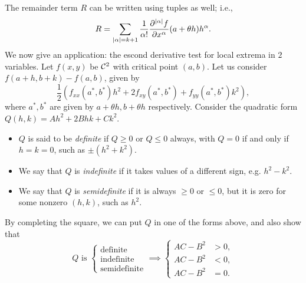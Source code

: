 The remainder term $R$ can be written using tuples as well; i.e.,
\[ R = \sum_{\left\lvert \alpha \right\rvert = k+1} \frac{1}{\alpha!} \frac{\partial^{\left\lvert \alpha \right\rvert} f}{\partial x^\alpha} (a + \theta h) h^\alpha. \]
We now give an application: the escond derivative test for local extrema in $2$ variables. Let $f(x, y)$ be $\mathcal C^2$ with critical point $(a, b)$. Let us consider $f(a + h, b + k) - f(a, b)$, given by
\[ \frac{1}{2} \left( f_{xx} (a^\ast, b^\ast) h^2 + 2 f_{xy} (a^\ast, b^\ast) + f_{yy} (a^\ast, b^\ast) k^2 \right), \]
where $a^\ast, b^\ast$ are given by $a + \theta h, b + \theta h$ respectively. Consider the quadratic form $Q(h, k) = Ah^2 + 2Bhk + Ck^2$.
\begin{itemize}
    \item $Q$ is said to be \textit{definite} if $Q \geq 0$ or $Q \leq 0$ always, with $Q = 0$ if and only if $h = k = 0$, such as $\pm(h^2 + k^2)$.
    \item We say that $Q$ is \textit{indefinite} if it takes values of a different sign, e.g. $h^2 - k^2$.
    \item We say that $Q$ is \textit{semidefinite} if it is always $\geq 0$ or $\leq 0$, but it is zero for some nonzero $(h, k)$, such as $h^2$.
\end{itemize}
By completing the square, we can put $Q$ in one of the forms above, and also show that
\[ Q \text{ is } \begin{cases} \text{definite} \\ \text{indefinite} \\ \text{semidefinite} \end{cases} \implies \begin{cases} AC - B^2 &> 0, \\ AC - B^2 &< 0, \\ AC - B^2 &= 0. \end{cases} \] 
